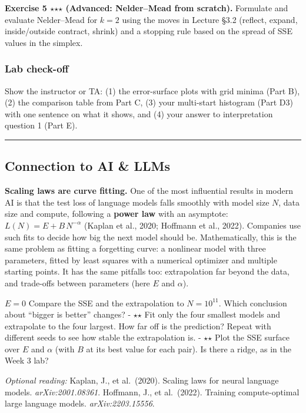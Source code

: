 \textbf{Exercise 5 \ensuremath{\star}\ensuremath{\star}\ensuremath{\star} (Advanced: Nelder--Mead from scratch).} Formulate and evaluate
Nelder--Mead for \(k = 2\) using the moves in Lecture §3.2 (reflect,
expand, inside/outside contract, shrink) and a stopping rule based on
the spread of SSE values in the simplex.

\subsubsection{Lab check-off}

Show the instructor or TA: (1) the error-surface plots with grid minima
(Part B), (2) the comparison table from Part C, (3) your multi-start
histogram (Part D3) with one sentence on what it shows, and (4) your
answer to interpretation question 1 (Part E).

\begin{center}\rule{0.5\linewidth}{0.5pt}\end{center}

\subsection{Connection to AI \& LLMs}

\textbf{Scaling laws are curve fitting.} One of the most influential
results in modern AI is that the test loss of language models falls
smoothly with model size \(N\), data size and compute, following a
\textbf{power law} with an asymptote: \(L(N) = E + B\,N^{-\alpha}\)
(Kaplan et al., 2020; Hoffmann et al., 2022). Companies use such fits to
decide how big the next model should be. Mathematically, this is the
same problem as fitting a forgetting curve: a nonlinear model with three
parameters, fitted by least squares with a numerical optimizer and
multiple starting points. It has the same pitfalls too: extrapolation
far beyond the data, and trade-offs between parameters (here \(E\) and
\(\alpha\)).

\(E = 0\) Compare the SSE and the extrapolation to \(N = 10^{11}\).
Which conclusion about ``bigger is better'' changes? - \ensuremath{\star}\ensuremath{\star} Fit only the
four smallest models and extrapolate to the four largest. How far off is
the prediction? Repeat with different seeds to see how stable the
extrapolation is. - \ensuremath{\star}\ensuremath{\star} Plot the SSE surface over \(E\) and \(\alpha\)
(with \(B\) at its best value for each pair). Is there a ridge, as in
the Week 3 lab?

\emph{Optional reading:} Kaplan, J., et al.~(2020). Scaling laws for
neural language models. \emph{arXiv:2001.08361}. Hoffmann, J., et
al.~(2022). Training compute-optimal large language models.
\emph{arXiv:2203.15556}.

